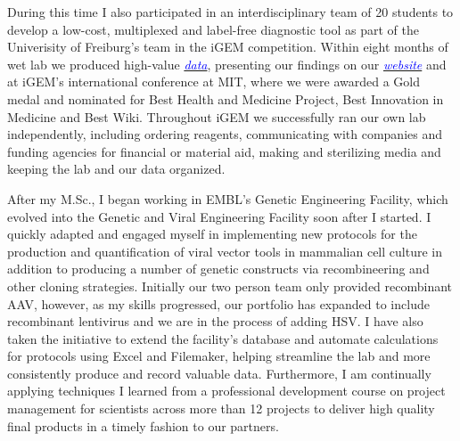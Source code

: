 \documentclass[11pt,a4paper,sans]{moderncv}
\begin{document}
\begin{spacing}{1.15}
During this time I also participated in an interdisciplinary team of 20 students to develop a low-cost, multiplexed and label-free diagnostic tool as part of the Univerisity of Freiburg's team in the iGEM competition.
Within eight months of wet lab we produced high-value {\href{https://www.ncbi.nlm.nih.gov/pubmed/29803867}{\textcolor{blue}{\textit{data}}}}, presenting our findings on our {\href{http://2015.igem.org/Team:Freiburg/Home_Intro}{\textcolor{blue}{\textit{website}}}} and at iGEM's international conference at MIT, where we were awarded a Gold medal and nominated for Best Health and Medicine Project, Best Innovation in Medicine and Best Wiki.
Throughout iGEM we successfully ran our own lab independently, including ordering reagents, communicating with companies and funding agencies for financial or material aid, making and sterilizing media and keeping the lab and our data organized.\par\vspace*{3mm}
		
After my M.Sc., I began working in EMBL's Genetic Engineering Facility, which evolved into the Genetic and Viral Engineering Facility soon after I started. 
I quickly adapted and engaged myself in implementing new protocols for the production and quantification of viral vector tools in mammalian cell culture  in addition to producing a number of genetic constructs via recombineering and other cloning strategies.
Initially our two person team only provided recombinant AAV, however, as my skills progressed, our portfolio has expanded to include recombinant lentivirus and we are in the process of adding HSV.
I have also taken the initiative to extend the facility's database and automate calculations for protocols using Excel and Filemaker, helping streamline the lab and more consistently produce and record valuable data. 
Furthermore, I am continually applying techniques I learned from a professional development course on project management for scientists across more than 12 projects to deliver high quality final products in a timely fashion to our partners.\par%


\end{spacing}
\end{document}
